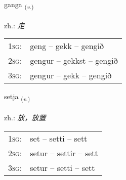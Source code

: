\documentclass[frontgrid, backgrid]{flacards}\usepackage[]{graphicx}\usepackage[]{xcolor}
\begin{document}
\renewcommand{\flhead}{\vskip5pt \fboxsep=0pt {\small\bfseries\footnotesize Sagnorð | 动词}}
\renewcommand{\fcfoot}{\vskip5pt \fboxsep=0pt \hspace{2pt}{\small\bfseries\footnotesize 1K}}

\renewcommand{\blhead}{\vskip5pt {\small\bfseries\footnotesize Sagnorð | 动词 }}
\renewcommand{\bcfoot}{\vskip5pt \hspace{2pt}{\small\bfseries\footnotesize 1K}}


{ganga \small{\textsubscript{(\textit{v.})}} \\[1ex] %
\textphonetic{[kauŋka]} \\
zh.: \emph{走} \\  [2ex]
\renewcommand*{\arraystretch}{0.8}
\begin{tabular}{p{1cm}l}
\textsc{1sg}: & geng -- gekk -- gengið \\ 
\textsc{2sg}: & gengur -- gekkst -- gengið \\ 
\textsc{3sg}: & gengur -- gekk -- gengið \\ 
\end{tabular}
}

\renewcommand{\flhead}{\vskip5pt \fboxsep=0pt {\small\bfseries\footnotesize Sagnorð | 动词}}
\renewcommand{\fcfoot}{\vskip5pt \fboxsep=0pt \hspace{2pt}{\small\bfseries\footnotesize 1K}}

\renewcommand{\blhead}{\vskip5pt {\small\bfseries\footnotesize Sagnorð | 动词 }}
\renewcommand{\bcfoot}{\vskip5pt \hspace{2pt}{\small\bfseries\footnotesize 1K}}


{setja \small{\textsubscript{(\textit{v.})}} \\[1ex] %
\textphonetic{[sɛːtja]} \\
zh.: \emph{放，放置} \\  [2ex]
\renewcommand*{\arraystretch}{0.8}
\begin{tabular}{p{1cm}l}
\textsc{1sg}: & set -- setti -- sett \\ 
\textsc{2sg}: & setur -- settir -- sett \\ 
\textsc{3sg}: & setur -- setti -- sett \\ 
\end{tabular}
}
\end{document}
